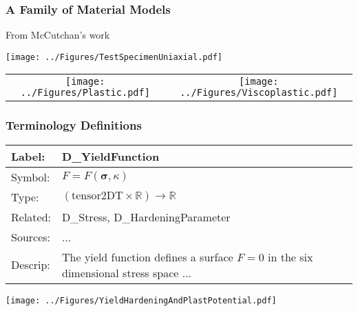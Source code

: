 \documentclass[t,12pt,numbers,fleqn]{beamer}
\newcommand{\colAwidth}{0.15\textwidth}
\newcommand{\colBwidth}{0.7\textwidth}
\begin{document}

\begin{frame}

\frametitle{A Family of Material Models}

From McCutchan's work \cite{CaretteEtAl2008, SmithMcCutchanAndCao2007,
  SmithEtAl2008, CaretteEtAl2007_TR, SmithMcCutchanAndCarette2017, McCutchan2007}

\begin{center}
{
\texttt{[image: ../Figures/TestSpecimenUniaxial.pdf]}
}
\end{center}

\begin{center}
\begin{tabular}{cc}
\texttt{[image: ../Figures/Plastic.pdf]} &
\texttt{[image: ../Figures/Viscoplastic.pdf]}\\
\end{tabular}
\end{center}

\end{frame}


\begin{frame}

\frametitle{Terminology Definitions}

\begin{minipage}{\textwidth}
\begin{tabular}{| p{\colAwidth} | p{\colBwidth}|}
\hline
\rowcolor[gray]{0.9}
Label: & D\_YieldFunction\\ \hline
Symbol: & $F = F(\bm{\sigma}, \kappa)$\\ \hline
Type: & $(\mbox{tensor2DT} \times \mathbb{R}) \rightarrow \mathbb{R}$\\ \hline
Related: & {D\_Stress}, {D\_HardeningParameter}\\ \hline %
Sources: & ...\\
\hline Descrip: & The yield function defines a surface $F = 0$ in the six dimensional stress space ...\\
\hline
\end{tabular}
\end{minipage}

\begin{center}
{
\texttt{[image: ../Figures/YieldHardeningAndPlastPotential.pdf]}
}
\end{center}

\end{frame}
\end{document}
